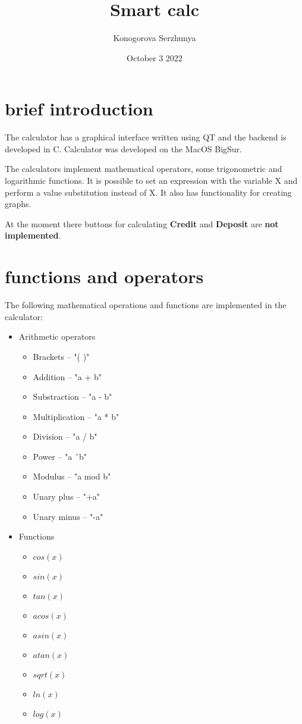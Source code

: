 \documentclass[12pt, a4paper]{article}
\title{Smart calc}
\author{Konogorova Serzhunya}
\date{October 3 2022}
\begin{document}
\maketitle

\pagebreak

\tableofcontents

\pagebreak

\section{brief introduction}

The calculator has a graphical interface written using QT and the backend is developed in C.
Calculator was developed on the MacOS BigSur.

The calculators implement mathematical operators, some trigonometric and logarithmic functions. It is possible to set an expression with the variable X and perform a value substitution instead of X. It also has functionality for creating graphs.

At the moment there buttons for calculating \textbf{Credit} and \textbf{Deposit} are \textbf{not implemented}.

\pagebreak

\section{functions and operators}

The following mathematical operations and functions are implemented in the calculator:
  \begin{itemize}
    \item Arithmetic operators
    \begin{itemize}
      \item Brackets -- "( )"
      \item Addition -- "a + b"
      \item Substraction -- "a - b"
      \item Multiplication -- "a * b"
      \item Division -- "a / b"
      \item Power -- "a \^\ b"
      \item Modulus -- "a mod b"
      \item Unary plus -- "+a"
      \item Unary minus -- "-a"
    \end{itemize}
    \item Functions
    \begin{itemize}
      \item $cos(x)$
      \item $sin(x)$
      \item $tan(x)$
      \item $acos(x)$
      \item $asin(x)$
      \item $atan(x)$
      \item $sqrt(x)$
      \item $ln(x)$
      \item $log(x)$
    \end{itemize}
  \end{itemize}
\end{document}
